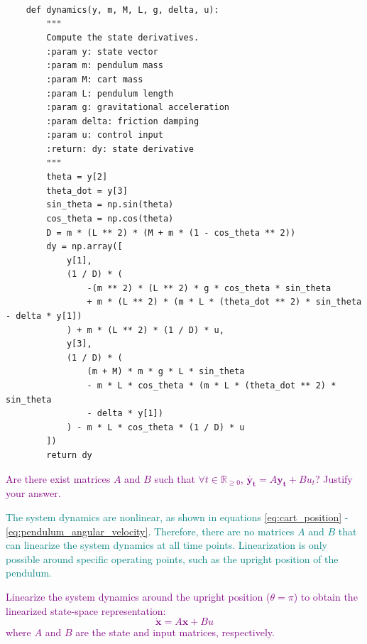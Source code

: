\documentclass[a4 paper]{article}
\begin{document}
\begin{verbatim}
    def dynamics(y, m, M, L, g, delta, u):
        """
        Compute the state derivatives.
        :param y: state vector
        :param m: pendulum mass
        :param M: cart mass
        :param L: pendulum length
        :param g: gravitational acceleration
        :param delta: friction damping
        :param u: control input
        :return: dy: state derivative
        """
        theta = y[2]
        theta_dot = y[3]
        sin_theta = np.sin(theta)
        cos_theta = np.cos(theta)
        D = m * (L ** 2) * (M + m * (1 - cos_theta ** 2))    
        dy = np.array([
            y[1],
            (1 / D) * (
                -(m ** 2) * (L ** 2) * g * cos_theta * sin_theta 
                + m * (L ** 2) * (m * L * (theta_dot ** 2) * sin_theta - delta * y[1])
            ) + m * (L ** 2) * (1 / D) * u,
            y[3],
            (1 / D) * (
                (m + M) * m * g * L * sin_theta 
                - m * L * cos_theta * (m * L * (theta_dot ** 2) * sin_theta 
                - delta * y[1])
            ) - m * L * cos_theta * (1 / D) * u
        ])
        return dy
\end{verbatim}


\medbreak

\textcolor{purple}{
     Are there exist matrices $A$ and $B$ such that $\forall t \in \mathbb{R}_{\geq 0}$,  $\dot{\mathbf{y_t}} = A \mathbf{y_t} + B u_t $? Justify your answer.
}

\medbreak

\textcolor{teal}{
    The system dynamics are nonlinear, as shown in equations \ref{eq:cart_position} - \ref{eq:pendulum_angular_velocity}. 
    Therefore, there are no matrices \( A \) and \( B \) that can linearize the system dynamics at all time points. 
    Linearization is only possible around specific operating points, such as the upright position of the pendulum. 
}

\medbreak

\textcolor{purple}{
     Linearize the system dynamics around the upright position (\(\theta = \pi\)) to obtain the linearized state-space representation:
    \begin{equation*}
        \dot{\mathbf{x}} = A \mathbf{x} + B u
    \end{equation*}
    where \( A \) and \( B \) are the state and input matrices, respectively. 
}

\medbreak
\end{document}
